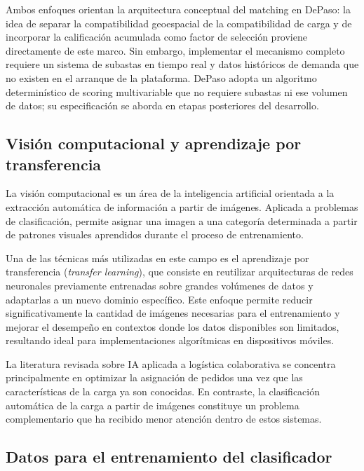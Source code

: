 Ambos enfoques orientan la arquitectura conceptual del matching en DePaso: la idea de separar la compatibilidad geoespacial de la compatibilidad de carga y de incorporar la calificación acumulada como factor de selección proviene directamente de este marco. Sin embargo, implementar el mecanismo completo requiere un sistema de subastas en tiempo real y datos históricos de demanda que no existen en el arranque de la plataforma. DePaso adopta un algoritmo determinístico de scoring multivariable que no requiere subastas ni ese volumen de datos; su especificación se aborda en etapas posteriores del desarrollo.

\subsection{Visión computacional y aprendizaje por transferencia}

La visión computacional es un área de la inteligencia artificial orientada a la extracción automática de información a partir de imágenes. Aplicada a problemas de clasificación, permite asignar una imagen a una categoría determinada a partir de patrones visuales aprendidos durante el proceso de entrenamiento.

Una de las técnicas más utilizadas en este campo es el aprendizaje por transferencia (\emph{transfer learning}), que consiste en reutilizar arquitecturas de redes neuronales previamente entrenadas sobre grandes volúmenes de datos y adaptarlas a un nuevo dominio específico. Este enfoque permite reducir significativamente la cantidad de imágenes necesarias para el entrenamiento y mejorar el desempeño en contextos donde los datos disponibles son limitados, resultando ideal para implementaciones algorítmicas en dispositivos móviles.

La literatura revisada sobre IA aplicada a logística colaborativa se concentra principalmente en optimizar la asignación de pedidos una vez que las características de la carga ya son conocidas. En contraste, la clasificación automática de la carga a partir de imágenes constituye un problema complementario que ha recibido menor atención dentro de estos sistemas.

\subsection{Datos para el entrenamiento del clasificador}

